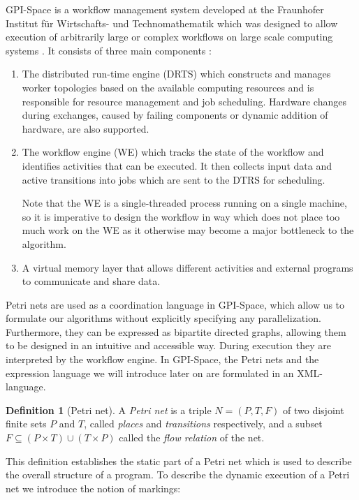 \documentclass[
  paper=a4,
  titlepage,
  bibliography=totoc,
  pagesize=pdftex
]{scrartcl}
\numberwithin{figure}{section}
\numberwithin{equation}{section}
\numberwithin{table}{section}
\theoremstyle{definition}
\newtheorem{definition}{Definition}
\numberwithin{definition}{section}
\begin{document}
GPI-Space is a workflow management system developed at the Fraunhofer Institut für
Wirtschafts- und Technomathematik which was designed to allow execution of arbitrarily
large or complex workflows on large scale computing systems \cite{gpispace}. It consists
of three main components \cite[Section~4.1]{reinboldGitFan}:
\begin{enumerate}[label=\arabic*.]
  \item The distributed run-time engine (DRTS) which constructs and manages worker
    topologies based on the available computing resources and is responsible for resource
    management and job scheduling. Hardware changes during exchanges, caused by failing
    components or dynamic addition of hardware, are also supported.
  \item The workflow engine (WE) which tracks the state of the workflow and identifies
    activities that can be executed. It then collects input data and active transitions
    into jobs which are sent to the DTRS for scheduling.

    Note that the WE is a single-threaded process running on a single machine, so it is
    imperative to design the workflow in way which does not place too much work on the WE
    as it otherwise may become a major bottleneck to the algorithm.
  \item A virtual memory layer that allows different activities and external programs to
    communicate and share data.
\end{enumerate}

Petri nets are used as a coordination language in GPI-Space, which allow us to formulate
our algorithms without explicitly specifying any parallelization. Furthermore, they can be
expressed as bipartite directed graphs, allowing them to be designed in an intuitive and
accessible way. During execution they are interpreted by the workflow engine. In
GPI-Space, the Petri nets and the expression language we will introduce later on are
formulated in an XML-language.

\begin{definition}[Petri net]
  \label{def:petri}
  A \emph{Petri net} is a triple $N = (P, T, F)$ of two disjoint finite sets $P$ and $T$,
  called \emph{places} and \emph{transitions} respectively, and a subset $F \subseteq
  (P\times T) \cup (T \times P)$ called the \emph{flow relation} of the net.
\end{definition}

This definition establishes the static part of a Petri net which is used to describe the
overall structure of a program. To describe the dynamic execution of a Petri net we
introduce the notion of markings:
\end{document}
